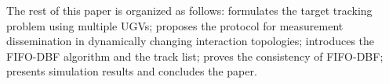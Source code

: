 	
	The rest of this paper is organized as follows: 
	 formulates the target tracking problem using multiple UGVs;
	 proposes the {\proto} protocol for measurement dissemination in dynamically changing interaction topologies;
	 introduces the FIFO-DBF algorithm and the track list;
	 proves the consistency of FIFO-DBF;
	 presents simulation results and  concludes the paper.